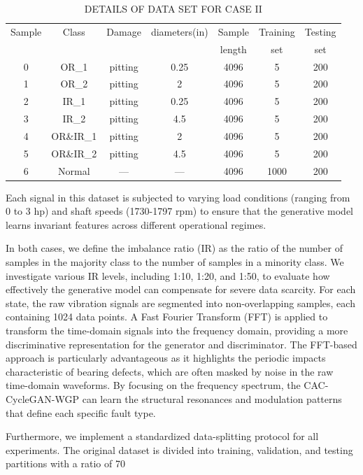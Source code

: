 \documentclass[twocolumn]{IEEEtran}
\begin{document}
\begin{table}[htbp]
\centering
\caption{DETAILS OF DATA SET FOR CASE II}
\label{tab:dataset_caseII}
\begin{tabular}{ccccccc}
\hline
Sample & Class & Damage & diameters(in) & Sample & Training & Testing \\
 & & & & length & set & set \\
\hline
0 & OR\_1 & pitting & 0.25 & 4096 & 5 & 200 \\
1 & OR\_2 & pitting & 2 & 4096 & 5 & 200 \\
2 & IR\_1 & pitting & 0.25 & 4096 & 5 & 200 \\
3 & IR\_2 & pitting & 4.5 & 4096 & 5 & 200 \\
4 & OR\&IR\_1 & pitting & 2 & 4096 & 5 & 200 \\
5 & OR\&IR\_2 & pitting & 4.5 & 4096 & 5 & 200 \\
6 & Normal & --- & --- & 4096 & 1000 & 200 \\
\hline
\end{tabular}
\end{table}
Each signal in this dataset is subjected to varying load conditions (ranging from 0 to 3 hp) and shaft speeds (1730-1797 rpm) to ensure that the generative model learns invariant features across different operational regimes.

In both cases, we define the imbalance ratio (IR) as the ratio of the number of samples in the majority class to the number of samples in a minority class. We investigate various IR levels, including 1:10, 1:20, and 1:50, to evaluate how effectively the generative model can compensate for severe data scarcity. For each state, the raw vibration signals are segmented into non-overlapping samples, each containing 1024 data points. A Fast Fourier Transform (FFT) is applied to transform the time-domain signals into the frequency domain, providing a more discriminative representation for the generator and discriminator. The FFT-based approach is particularly advantageous as it highlights the periodic impacts characteristic of bearing defects, which are often masked by noise in the raw time-domain waveforms. By focusing on the frequency spectrum, the CAC-CycleGAN-WGP can learn the structural resonances and modulation patterns that define each specific fault type.

Furthermore, we implement a standardized data-splitting protocol for all experiments. The original dataset is divided into training, validation, and testing partitions with a ratio of 70%
\end{document}
